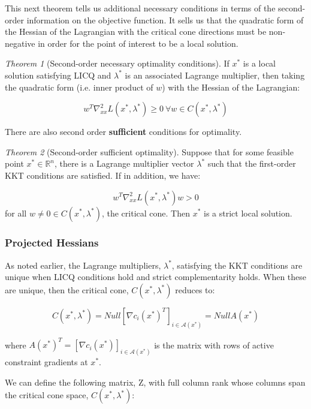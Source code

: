 \documentclass[class=article, crop=false]{standalone}
\theoremstyle{definition}
\theoremstyle{remark}
\theoremstyle{lemma}
\theoremstyle{theorem}
\newtheorem*{theorem}{Theorem}
\theoremstyle{corollary}
\theoremstyle{property}
\begin{document}
			This next theorem tells us additional necessary conditions in terms of the second-order information on the objective function. It sells us that the quadratic form of the Hessian of the Lagrangian with the critical cone directions must be non-negative in order for the point of interest to be a local solution.

			\begin{theorem} [Second-order necessary optimality conditions]
				If $x^*$ is a local solution satisfying LICQ and $\lambda^*$ is an associated Lagrange multiplier, then taking the quadratic form (i.e. inner product of $w$) with the Hessian of the Lagrangian:

				$$w^T \nabla_{xx}^2 L(x^*, \lambda^*) \ge 0 \ \forall w \in C(x^*, \lambda^*)$$
			\end{theorem}

			There are also second order \textbf{sufficient} conditions for optimality. 

			\begin{theorem} [Second-order sufficient optimality]
				Suppose that for some feasible point $x^* \in \mathbb{R}^n$, there is a Lagrange multiplier vector $\lambda^*$ such that the first-order KKT conditions are satisfied. If in addition, we have:

					$$w^T \nabla_{xx}^2 L(x^*, \lambda^*)w > 0$$
				for all $w \neq 0 \in C(x^*, \lambda^*)$, the critical cone. Then $x^*$ is a strict local solution.
			\end{theorem}

		\subsubsection{Projected Hessians}

			As noted earlier, the Lagrange multipliers, $\lambda^*$, satisfying the KKT conditions are unique when LICQ conditions hold and strict complementarity holds. When these are unique, then the critical cone, $C(x^*, \lambda^*)$ reduces to:

				$$C(x^*, \lambda^*) = Null[ \nabla c_i(x^*)^T ]_{i \in \mathcal{A}(x^*)} = Null A(x^*)$$

			where $A(x^*)^T = [\nabla c_i(x^*)]_{i \in \mathcal{A}(x^*)}$ is the matrix with rows of active constraint gradients at $x^*$. 

			We can define the following matrix, Z, with full column rank whose columns span the critical cone space, $C(x^*, \lambda^*)$:
\end{document}
